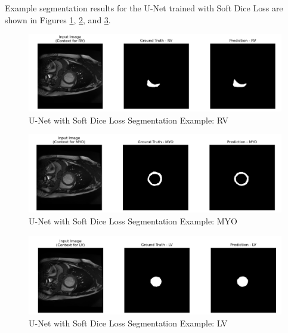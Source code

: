 \documentclass{article}
\begin{document}
Example segmentation results for the U-Net trained with Soft Dice Loss are shown in Figures \ref{fig:soft_dice_example_lv}, \ref{fig:soft_dice_example_myo}, and \ref{fig:soft_dice_example_rv}.
\begin{figure}[H]
  \centering
  \includegraphics[width=\linewidth]{../result/for_ppt/soft_dice_loss_RV.png}
  \caption{U-Net with Soft Dice Loss Segmentation Example: RV}
  \label{fig:soft_dice_example_lv}
\end{figure}
\begin{figure}[H]
  \centering
  \includegraphics[width=\linewidth]{../result/for_ppt/soft_dice_loss_MYO.png}
  \caption{U-Net with Soft Dice Loss Segmentation Example: MYO}
  \label{fig:soft_dice_example_myo}
\end{figure}
\begin{figure}[H]
  \centering
  \includegraphics[width=\linewidth]{../result/for_ppt/soft_dice_loss_LV.png}
  \caption{U-Net with Soft Dice Loss Segmentation Example: LV}
  \label{fig:soft_dice_example_rv}
\end{figure}
\end{document}
